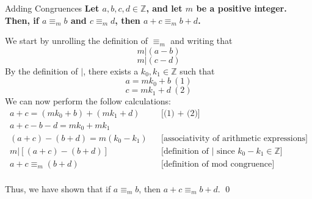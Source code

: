 \documentclass[11pt, nopagenumbers]{adamblan-hw}
\begin{document}
    \begin{question}{\color{red} Adding Congruences}
        \textbf{Let $a, b, c, d \in \mathbb{Z}$, and let $m$ be a positive integer.
        Then, if $a \equiv_m b$ and $c \equiv_m d$, then $a + c \equiv_m b + d$.}

        We start by unrolling the definition of $\equiv_m$ and writing that
        $$m | (a - b)$$
        $$m | (c - d)$$
        By the definition of $|$, there exists a $k_0, k_1 \in \mathbb{Z}$ such that
        $$a = mk_0 + b \ (1)$$
        $$c = mk_1 + d \ (2)$$
        We can now perform the follow calculations:
        \begin{align*}
            a + c = (mk_0 + b) + (mk_1 + d) && \text{[(1) + (2)]} \\
            a + c - b - d = mk_0 + mk_1 \\
            (a + c) - (b + d) = m(k_0 - k_1) && \text{[associativity of arithmetic expressions]} \\
            m | [(a + c) - (b + d)] && \text{[definition of | since $k_0 - k_1 \in \mathbb{Z}$]} \\
            a + c \equiv_m (b + d) && \text{[definition of mod congruence]} \\
        \end{align*}
        
        Thus, we have shown that if $a \equiv_m b$, then $a + c \equiv_m b + d$.
        \qed
    \end{question}
\end{document}
